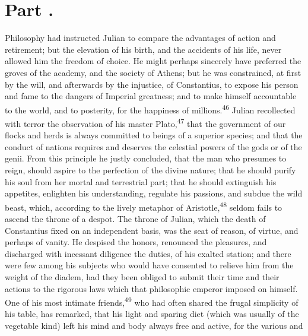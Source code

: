 
\section{Part \thesection.}

Philosophy had instructed Julian to compare the advantages of
action and retirement; but the elevation of his birth, and the
accidents of his life, never allowed him the freedom of choice.
He might perhaps sincerely have preferred the groves of the
academy, and the society of Athens; but he was constrained, at
first by the will, and afterwards by the injustice, of
Constantius, to expose his person and fame to the dangers of
Imperial greatness; and to make himself accountable to the world,
and to posterity, for the happiness of millions.\textsuperscript{46} Julian
recollected with terror the observation of his master Plato,\textsuperscript{47}
that the government of our flocks and herds is always committed
to beings of a superior species; and that the conduct of nations
requires and deserves the celestial powers of the gods or of the
genii. From this principle he justly concluded, that the man who
presumes to reign, should aspire to the perfection of the divine
nature; that he should purify his soul from her mortal and
terrestrial part; that he should extinguish his appetites,
enlighten his understanding, regulate his passions, and subdue
the wild beast, which, according to the lively metaphor of
Aristotle,\textsuperscript{48} seldom fails to ascend the throne of a despot. The
throne of Julian, which the death of Constantius fixed on an
independent basis, was the seat of reason, of virtue, and perhaps
of vanity. He despised the honors, renounced the pleasures, and
discharged with incessant diligence the duties, of his exalted
station; and there were few among his subjects who would have
consented to relieve him from the weight of the diadem, had they
been obliged to submit their time and their actions to the
rigorous laws which that philosophic emperor imposed on himself.
One of his most intimate friends,\textsuperscript{49} who had often shared the
frugal simplicity of his table, has remarked, that his light and
sparing diet (which was usually of the vegetable kind) left his
mind and body always free and active, for the various and
